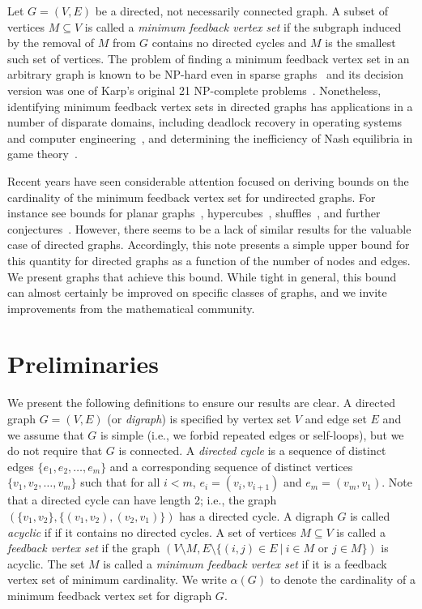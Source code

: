 \documentclass[preprint,12pt]{elsarticle}
\begin{document}


Let $G=(V,E)$ be a directed, not necessarily connected graph.
A subset of vertices $M\subseteq V$ is called a \emph{minimum feedback vertex set} if the subgraph induced by the removal of $M$ from $G$ contains no directed cycles and $M$ is the smallest such set of vertices.
The problem of finding a minimum feedback vertex set in an arbitrary graph is known to be NP-hard even in sparse graphs~\cite{Fomin2006,Borradaile2019} and its decision version was one of Karp's original 21 NP-complete problems~\cite{Karp1972}.
Nonetheless, identifying minimum feedback vertex sets in directed graphs has applications in a number of disparate domains, including deadlock recovery in operating systems and computer engineering~\cite{Lin2000}, and determining the inefficiency of Nash equilibria in game theory~\cite{Brown2019c}.


Recent years have seen considerable attention focused on deriving bounds on the cardinality of the minimum feedback vertex set for undirected graphs. For instance see bounds for planar graphs~\cite{Kelly2017}, hypercubes~\cite{Madelaine2008}, shuffles~\cite{Kralovic2003}, and further conjectures~\cite{Kowalik2010}.
However, there seems to be a lack of similar results for the valuable case of directed graphs.
Accordingly, this note presents a simple upper bound for this quantity for directed graphs as a function of the number of nodes and edges.
We present graphs that achieve this bound.
While tight in general, this bound can almost certainly be improved on specific classes of graphs, and we invite improvements from the mathematical community.

\section{Preliminaries}
We present the following definitions to ensure our results are clear.
A directed graph $G=(V,E)$ (or \emph{digraph}) is specified by vertex set $V$ and edge set $E$ and we assume that $G$ is simple (i.e., we forbid repeated edges or self-loops), but we do not require that $G$ is connected.
A \emph{directed cycle} is a sequence of distinct edges $\{e_1,e_2,\ldots,e_m\}$ and a corresponding sequence of distinct vertices $\{v_1,v_2,\ldots,v_m\}$ such that for all $i<m$, $e_i=(v_i,v_{i+1})$ and $e_m=(v_m,v_1)$.
Note that a directed cycle can have length 2; i.e., the graph $(\{v_1,v_2\},\{(v_1,v_2),(v_2,v_1)\})$ has a directed cycle.
A digraph $G$ is called \emph{acyclic} if if it contains no directed cycles.
A set of vertices $M\subseteq V$ is called a \emph{feedback vertex set} if the graph $\left(V\setminus M,E\setminus \{(i,j)\in E\ |\ i\in M \mbox{ or } j\in M\}\right)$ is acyclic.
The set $M$ is called a \emph{minimum feedback vertex set} if it is a feedback vertex set of minimum cardinality. 
We write $\alpha(G)$ to denote the cardinality of a minimum feedback vertex set for digraph $G$.
\end{document}
